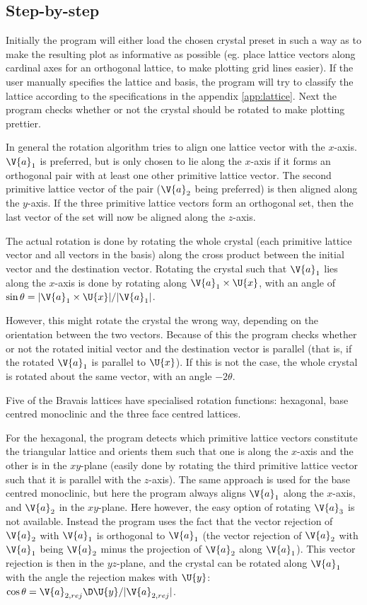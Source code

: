 \documentclass[main.tex]{subfiles}
\begin{document}
	
	\subsection{Step-by-step}
	Initially the program will either load the chosen crystal preset in such a way as to make the resulting plot as informative as possible (eg. place lattice vectors along cardinal axes for an orthogonal lattice, to make plotting grid lines easier). If the user manually specifies the lattice and basis, the program will try to classify the lattice according to the specifications in the appendix \ref{app:lattice}. Next the program checks whether or not the crystal should be rotated to make plotting prettier.
	
	In general the rotation algorithm tries to align one lattice vector with the $ x $-axis. $ \V{a}_1 $ is preferred, but is only chosen to lie along the $ x $-axis if it forms an orthogonal pair with at least one other primitive lattice vector. The second primitive lattice vector of the pair ($\V{a}_2$ being preferred) is then aligned along the $ y $-axis. If the three primitive lattice vectors form an orthogonal set, then the last vector of the set will now be aligned along the $ z $-axis.
	
	The actual rotation is done by rotating the whole crystal (each primitive lattice vector and all vectors in the basis) along the cross product between the initial vector and the destination vector. Rotating the crystal such that $ \V{a}_1 $ lies along the $ x $-axis is done by rotating along $ \V{a}_1 \times \U{x} $, with an angle of $ \sin \theta = |\V{a}_1 \times \U{x}| / |\V{a}_1| $.
	
	However, this might rotate the crystal the wrong way, depending on the orientation between the two vectors. Because of this the program checks whether or not the rotated initial vector and the destination vector is parallel (that is, if the rotated $ \V{a}_1 $ is parallel to $ \U{x} $). If this is not the case, the whole crystal is rotated about the same vector, with an angle $ -2\theta $.
	
	Five of the Bravais lattices have specialised rotation functions: hexagonal, base centred monoclinic and the three face centred lattices.
	
	For the hexagonal, the program detects which primitive lattice vectors constitute the triangular lattice and orients them such that one is along the $ x $-axis and the other is in the $ xy $-plane (easily done by rotating the third primitive lattice vector such that it is parallel with the $ z $-axis). The same approach is used for the base centred monoclinic, but here the program always aligns $ \V{a}_1 $ along the $ x $-axis, and $ \V{a}_2 $ in the $ xy $-plane. Here however, the easy option of rotating $ \V{a}_3 $ is not available. Instead the program uses the fact that the vector rejection of $ \V{a}_2 $ with $ \V{a}_1 $ is orthogonal to $ \V{a}_1 $ (the vector rejection of $ \V{a}_2 $ with $ \V{a}_1 $ being $ \V{a}_2 $ minus the projection of $ \V{a}_2 $ along $ \V{a}_1 $). This vector rejection is then in the $ yz $-plane, and the crystal can be rotated along $ \V{a}_1 $ with the angle the rejection makes with $ \U{y} $: $ \cos \theta = \V{a}_{2,rej} \D \U{y} / |\V{a}_{2,rej}|$.
	
\end{document}
